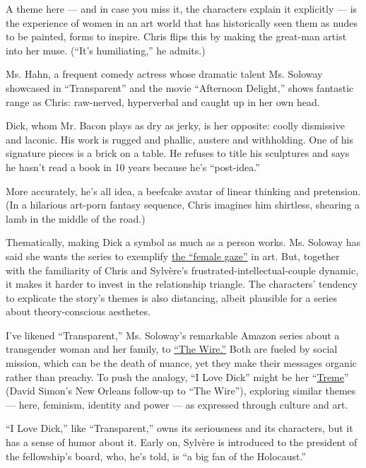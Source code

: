 A theme here --- and in case you miss it, the characters explain it
explicitly --- is the experience of women in an art world that has
historically seen them as nudes to be painted, forms to inspire. Chris
flips this by making the great-man artist into her muse. (``It's
humiliating,'' he admits.)

Ms. Hahn, a frequent comedy actress whose dramatic talent Ms. Soloway
showcased in ``Transparent'' and the movie ``Afternoon Delight,'' shows
fantastic range as Chris: raw-nerved, hyperverbal and caught up in her
own head.

Dick, whom Mr. Bacon plays as dry as jerky, is her opposite: coolly
dismissive and laconic. His work is rugged and phallic, austere and
withholding. One of his signature pieces is a brick on a table. He
refuses to title his sculptures and says he hasn't read a book in 10
years because he's ``post-idea.''

More accurately, he's all idea, a beefcake avatar of linear thinking and
pretension. (In a hilarious art-porn fantasy sequence, Chris imagines
him shirtless, shearing a lamb in the middle of the road.)

Thematically, making Dick a symbol as much as a person works. Ms.
Soloway has said she wants the series to exemplify
\href{https://www.nytimes3xbfgragh.onion/2017/05/05/arts/television/i-love-dick-amazon-chris-kraus-and-jill-soloway.html}{the
``female gaze''} in art. But, together with the familiarity of Chris and
Sylvère's frustrated-intellectual-couple dynamic, it makes it harder to
invest in the relationship triangle. The characters' tendency to
explicate the story's themes is also distancing, albeit plausible for a
series about theory-conscious aesthetes.

I've likened ``Transparent,'' Ms. Soloway's remarkable Amazon series
about a transgender woman and her family, to
\href{https://www.nytimes3xbfgragh.onion/2015/12/09/arts/television/season-2-of-transparent-expands-its-view-of-the-pfefferman-clan.html}{``The
Wire.''} Both are fueled by social mission, which can be the death of
nuance, yet they make their messages organic rather than preachy. To
push the analogy, ``I Love Dick'' might be her
``\href{https://www.nytimes3xbfgragh.onion/watching/recommendations/watching-tv-treme}{Treme}''
(David Simon's New Orleans follow-up to ``The Wire''), exploring similar
themes --- here, feminism, identity and power --- as expressed through
culture and art.

``I Love Dick,'' like ``Transparent,'' owns its seriousness and its
characters, but it has a sense of humor about it. Early on, Sylvère is
introduced to the president of the fellowship's board, who, he's told,
is ``a big fan of the Holocaust.''

